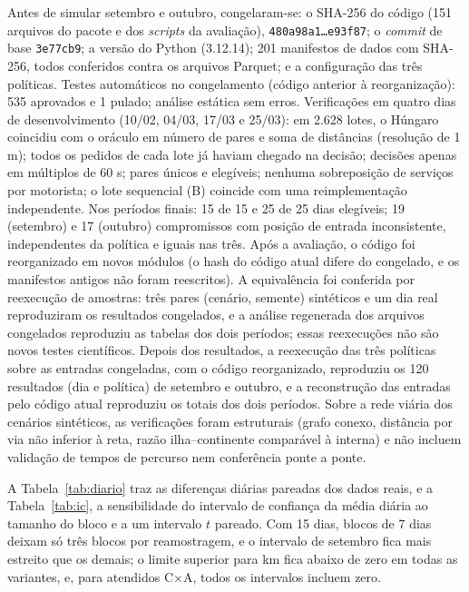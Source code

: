 Antes de simular setembro e outubro, congelaram-se: o SHA-256 do código (151 arquivos do pacote e dos \textit{scripts} da avaliação), \texttt{480a98a1\ldots e93f87}; o \textit{commit} de base \texttt{3e77cb9}; a versão do Python (3.12.14); 201 manifestos de dados com SHA-256, todos conferidos contra os arquivos Parquet; e a configuração das três políticas. Testes automáticos no congelamento (código anterior à reorganização): 535 aprovados e 1 pulado; análise estática sem erros. Verificações em quatro dias de desenvolvimento (10/02, 04/03, 17/03 e 25/03): em 2.628 lotes, o Húngaro coincidiu com o oráculo em número de pares e soma de distâncias (resolução de 1 m); todos os pedidos de cada lote já haviam chegado na decisão; decisões apenas em múltiplos de 60 s; pares únicos e elegíveis; nenhuma sobreposição de serviços por motorista; o lote sequencial (B) coincide com uma reimplementação independente. Nos períodos finais: 15 de 15 e 25 de 25 dias elegíveis; 19 (setembro) e 17 (outubro) compromissos com posição de entrada inconsistente, independentes da política e iguais nas três. Após a avaliação, o código foi reorganizado em novos módulos (o hash do código atual difere do congelado, e os manifestos antigos não foram reescritos). A equivalência foi conferida por reexecução de amostras: três pares (cenário, semente) sintéticos e um dia real reproduziram os resultados congelados, e a análise regenerada dos arquivos congelados reproduziu as tabelas dos dois períodos; essas reexecuções não são novos testes científicos. Depois dos resultados, a reexecução das três políticas sobre as entradas congeladas, com o código reorganizado, reproduziu os 120 resultados (dia e política) de setembro e outubro, e a reconstrução das entradas pelo código atual reproduziu os totais dos dois períodos. Sobre a rede viária dos cenários sintéticos, as verificações foram estruturais (grafo conexo, distância por via não inferior à reta, razão ilha--continente comparável à interna) e não incluem validação de tempos de percurso nem conferência ponte a ponte.


A Tabela~\ref{tab:diario} traz as diferenças diárias pareadas dos dados reais, e a Tabela~\ref{tab:ic}, a sensibilidade do intervalo de confiança da média diária ao tamanho do bloco e a um intervalo $t$ pareado. Com 15 dias, blocos de 7 dias deixam só três blocos por reamostragem, e o intervalo de setembro fica mais estreito que os demais; o limite superior para km fica abaixo de zero em todas as variantes, e, para atendidos C×A, todos os intervalos incluem zero.

